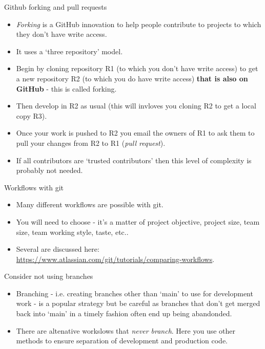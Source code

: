 \documentclass[usenames,dvipsnames]{beamer}
\begin{document}
\begin{frame}{Github forking and pull requests}
  \begin{block}{}
    \begin{itemize}
      \item{\textit{Forking} is a GitHub innovation to help people contribute to projects to which they don't have write access.}
      \item{It uses a `three repository' model.}
      \item{Begin by cloning repository R1 (to which you don't have write access) to get a new repository R2 (to which you do have write access) \textbf{that is also on GitHub} - this is called forking.}
      \item{Then develop in R2 as usual (this will invloves you cloning R2 to get a local copy R3).}
      \item{Once your work is pushed to R2 you email the owners of R1 to ask them to pull your changes from R2 to R1 (\textit{pull request}).}
      \item{If all contributors are `trusted contributors' then this level of complexity is probably not needed.}
    \end{itemize}
  \end{block}
\end{frame}

\begin{frame}{Workflows with git}
  \begin{block}{}
    \begin{itemize}
      \item{Many different workflows are possible with git.}
      \item{You will need to choose - it's a matter of project objective, project size, team size, team working style, taste, etc..}
      \item{Several are discussed here: \url{https://www.atlassian.com/git/tutorials/comparing-workflows}.}
    \end{itemize}
  \end{block}
\end{frame}

\begin{frame}{Consider not using branches}
  \begin{block}{}
    \begin{itemize}
      \item{Branching - i.e. creating branches other than `main' to use for development work - is a popular strategy but be careful as branches that don't get merged back into `main' in a timely fashion often end up being abandonded.}
      \item{There are altenative workslows that \textit{never branch}. Here you use other methods to ensure separation of development and production code.}

    \end{itemize}
  \end{block}
\end{frame}
\end{document}
